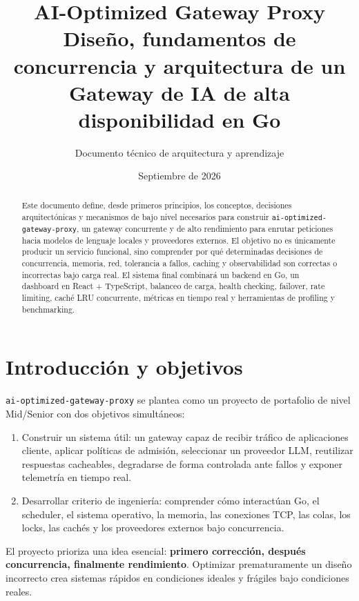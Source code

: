 \documentclass[11pt,a4paper]{article}
\title{\vspace{-1.2cm}\textbf{AI-Optimized Gateway Proxy}\\[0.25cm]
\large Diseño, fundamentos de concurrencia y arquitectura de un Gateway de IA de alta disponibilidad en Go}
\author{Documento técnico de arquitectura y aprendizaje}
\date{Septiembre de 2026}
\newcommand{\project}{\texttt{ai-optimized-gateway-proxy}}
\begin{document}
\maketitle
\vspace{-0.4cm}

\begin{abstract}
Este documento define, desde primeros principios, los conceptos, decisiones arquitectónicas y mecanismos de bajo nivel necesarios para construir \project{}, un gateway concurrente y de alto rendimiento para enrutar peticiones hacia modelos de lenguaje locales y proveedores externos. El objetivo no es únicamente producir un servicio funcional, sino comprender por qué determinadas decisiones de concurrencia, memoria, red, tolerancia a fallos, caching y observabilidad son correctas o incorrectas bajo carga real. El sistema final combinará un backend en Go, un dashboard en React + TypeScript, balanceo de carga, health checking, failover, rate limiting, caché LRU concurrente, métricas en tiempo real y herramientas de profiling y benchmarking.
\end{abstract}

\tableofcontents
\newpage

\section{Introducción y objetivos}

\project{} se plantea como un proyecto de portafolio de nivel Mid/Senior con dos objetivos simultáneos:

\begin{enumerate}
  \item Construir un sistema útil: un gateway capaz de recibir tráfico de aplicaciones cliente, aplicar políticas de admisión, seleccionar un proveedor LLM, reutilizar respuestas cacheables, degradarse de forma controlada ante fallos y exponer telemetría en tiempo real.
  \item Desarrollar criterio de ingeniería: comprender cómo interactúan Go, el scheduler, el sistema operativo, la memoria, las conexiones TCP, las colas, los locks, las cachés y los proveedores externos bajo concurrencia.
\end{enumerate}

El proyecto prioriza una idea esencial: \textbf{primero corrección, después concurrencia, finalmente rendimiento}. Optimizar prematuramente un diseño incorrecto crea sistemas rápidos en condiciones ideales y frágiles bajo condiciones reales.
\end{document}
